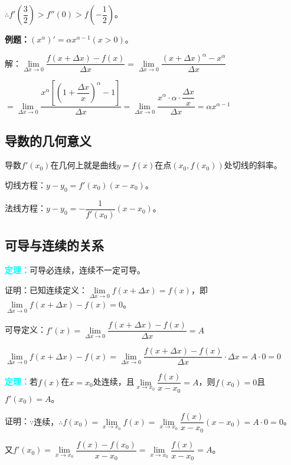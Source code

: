 \documentclass[UTF8, 12pt]{ctexart}
\begin{document}
        $\therefore f'(\dfrac{3}{2})>f''(0)>f(-\dfrac{1}{2})$。\medskip

        \textbf{例题：}$\left(x^\alpha\right)'=\alpha x^{\alpha-1}(x>0)$。\medskip

        解：$\lim\limits_{\Delta x\to 0}\dfrac{f(x+\Delta x)-f(x)}{\Delta x}=\lim\limits_{\Delta x\to 0}\dfrac{\left(x+\Delta x\right)^\alpha-x^\alpha}{\Delta x}$\medskip

        $=\lim\limits_{\Delta x\to 0}\dfrac{x^\alpha\left[\left(1+\dfrac{\Delta x}{x}\right)^\alpha-1\right]}{\Delta x}=\lim\limits_{\Delta x\to 0}\dfrac{x^\alpha\cdot\alpha\cdot\dfrac{\Delta x}{x}}{\Delta x}=\alpha x^{\alpha-1}$

        \subsection{导数的几何意义}

        导数$f'(x_0)$在几何上就是曲线$y=f(x)$在点$(x_0,f(x_0))$处切线的斜率。

        切线方程：$y-y_0=f'(x_0)(x-x_0)$。

        法线方程：$y-y_0=-\dfrac{1}{f'(x_0)}(x-x_0)$。

        \subsection{可导与连续的关系}

        \textcolor{aqua}{\textbf{定理：}}可导必连续，连续不一定可导。

        证明：已知连续定义：$\lim\limits_{\Delta x\to 0}f(x+\Delta x)=f(x)$，即$\lim\limits_{\Delta x\to 0}f(x+\Delta x)-f(x)=0$。

        可导定义：$f'(x)=\lim\limits_{\Delta x\to 0}\dfrac{f(x+\Delta x)-f(x)}{\Delta x} = A$

        $\lim\limits_{\Delta x\to 0}f(x+\Delta x)-f(x)=\lim\limits_{\Delta x\to 0}\dfrac{f(x+\Delta x)-f(x)}{\Delta x}\cdot\Delta x=A\cdot 0=0$

        \textcolor{aqua}{\textbf{定理：}}若$f(x)$在$x=x_0$处连续，且$\lim\limits_{x\to x_0}\dfrac{f(x)}{x-x_0}=A$，则$f(x_0)=0$且$f'(x_0)=A$。

        证明：$\because\text{连续，}\therefore f(x_0)=\lim\limits_{x\to x_0}f(x)=\lim\limits_{x\to x_0}\dfrac{f(x)}{x-x_0}(x-x_0)=A\cdot 0=0$。

        又$f'(x_0)=\lim\limits_{x\to x_0}\dfrac{f(x)-f(x_0)}{x-x_0}=\lim\limits_{x\to x_0}\dfrac{f(x)}{x-x_0}=A$。
\end{document}
